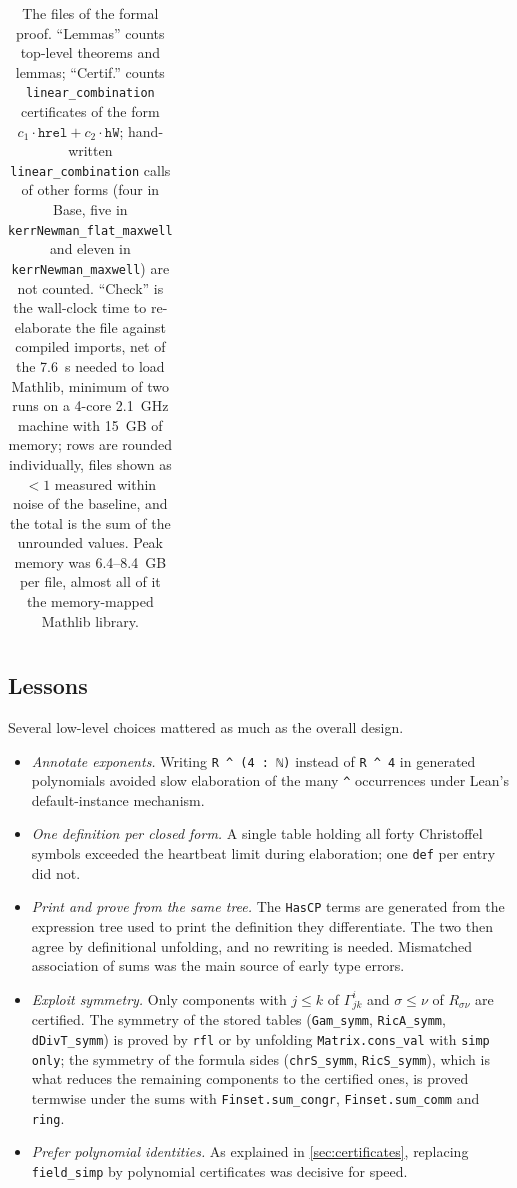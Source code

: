 \documentclass[11pt]{article}
\theoremstyle{definition}
\theoremstyle{remark}
\newcommand{\lean}[1]{\lstinline[basicstyle=\ttfamily\normalsize,columns=fullflexible,breaklines=false]{#1}}
\begin{document}
\begin{table}[t]
\begin{tabular}{@{}llrrrrr@{}}
\bottomrule
\end{tabular}
\caption{The files of the formal proof.
``Lemmas'' counts top-level theorems and lemmas; ``Certif.'' counts \lean{linear_combination} certificates of the form $c_1\cdot\mathtt{hrel}+c_2\cdot\mathtt{hW}$; hand-written \lean{linear_combination} calls of other forms (four in Base, five in \texttt{kerrNewman\_flat\_maxwell} and eleven in \texttt{kerrNewman\_maxwell}) are not counted.
``Check'' is the wall-clock time to re-elaborate the file against compiled imports, net of the 7.6~s needed to load Mathlib, minimum of two runs on a 4-core 2.1~GHz machine with 15~GB of memory; rows are rounded individually, files shown as $<1$ measured within noise of the baseline, and the total is the sum of the unrounded values.
Peak memory was 6.4--8.4~GB per file, almost all of it the memory-mapped Mathlib library.}
\label{tab:blocks}
\end{table}

\subsection{Lessons}

Several low-level choices mattered as much as the overall design.
\begin{itemize}
  \item \emph{Annotate exponents.}
  Writing \lean{R ^ (4 : ℕ)} instead of \lean{R ^ 4} in generated polynomials avoided slow elaboration of the many \lean{^} occurrences under Lean's default-instance mechanism.
  \item \emph{One definition per closed form.}
  A single table holding all forty Christoffel symbols exceeded the heartbeat limit during elaboration; one \lean{def} per entry did not.
  \item \emph{Print and prove from the same tree.}
  The \lean{HasCP} terms are generated from the expression tree used to print the definition they differentiate.
  The two then agree by definitional unfolding, and no rewriting is needed.
  Mismatched association of sums was the main source of early type errors.
  \item \emph{Exploit symmetry.}
  Only components with $j\le k$ of $\Gamma^i_{jk}$ and $\sigma\le\nu$ of $R_{\sigma\nu}$ are certified.
  The symmetry of the stored tables (\lean{Gam_symm}, \lean{RicA_symm}, \lean{dDivT_symm}) is proved by \lean{rfl} or by unfolding \lean{Matrix.cons_val} with \lean{simp only}; the symmetry of the formula sides (\lean{chrS_symm}, \lean{RicS_symm}), which is what reduces the remaining components to the certified ones, is proved termwise under the sums with \lean{Finset.sum_congr}, \lean{Finset.sum_comm} and \lean{ring}.
  \item \emph{Prefer polynomial identities.}
  As explained in \cref{sec:certificates}, replacing \lean{field_simp} by polynomial certificates was decisive for speed.
\end{itemize}
\end{document}
